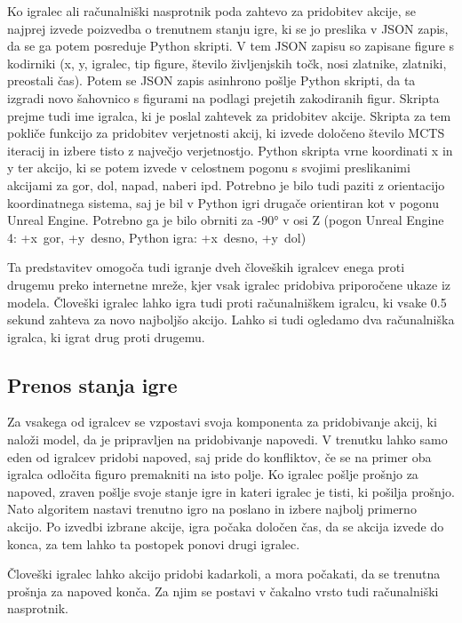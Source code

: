 \documentclass[a4paper, 12pt]{book}
\begin{document}
{Ko igralec ali računalniški nasprotnik poda zahtevo za pridobitev akcije, se najprej izvede poizvedba o trenutnem stanju igre, ki se jo preslika v JSON zapis, da se ga potem posreduje Python skripti.
V tem JSON zapisu so zapisane figure s kodirniki (x, y, igralec, tip figure, število življenjskih točk, nosi zlatnike, zlatniki, preostali čas).
Potem se JSON zapis asinhrono pošlje Python skripti, da ta izgradi novo šahovnico s figurami na podlagi prejetih zakodiranih figur.
Skripta prejme tudi ime igralca, ki je poslal zahtevek za pridobitev akcije.
Skripta za tem pokliče funkcijo za pridobitev verjetnosti akcij, ki izvede določeno število MCTS iteracij in izbere tisto z največjo verjetnostjo.
Python skripta vrne koordinati x in y ter akcijo, ki se potem izvede v celostnem pogonu s svojimi preslikanimi akcijami za gor, dol, napad, naberi ipd.
Potrebno je bilo tudi paziti z orientacijo koordinatnega sistema, saj je bil v Python igri drugače orientiran kot v pogonu Unreal Engine. 
Potrebno ga je bilo obrniti za -90° v osi Z (pogon Unreal Engine 4: +x~gor, +y~desno, Python igra: +x~desno, +y~dol)

Ta predstavitev omogoča tudi igranje dveh človeških igralcev enega proti drugemu preko internetne mreže, kjer vsak igralec pridobiva priporočene ukaze iz modela.
Človeški igralec lahko igra tudi proti računalniškem igralcu, ki vsake 0.5 sekund zahteva za novo najboljšo akcijo.
Lahko si tudi ogledamo dva računalniška igralca, ki igrat drug proti drugemu.

\subsection{Prenos stanja igre}
Za vsakega od igralcev se vzpostavi svoja komponenta za pridobivanje akcij, ki naloži model, da je pripravljen na pridobivanje napovedi.
V trenutku lahko samo eden od igralcev pridobi napoved, saj pride do konfliktov, če se na primer oba igralca odločita figuro premakniti na isto polje.
Ko igralec pošlje prošnjo za napoved, zraven pošlje svoje stanje igre in kateri igralec je tisti, ki pošilja prošnjo.
Nato algoritem nastavi trenutno igro na poslano in izbere najbolj primerno akcijo.
Po izvedbi izbrane akcije, igra počaka določen čas, da se akcija izvede do konca, za tem lahko ta postopek ponovi drugi igralec.

Človeški igralec lahko akcijo pridobi kadarkoli, a mora počakati, da se trenutna prošnja za napoved konča. Za njim se postavi v čakalno vrsto tudi računalniški nasprotnik.

}
\end{document}
